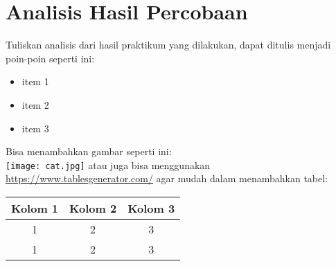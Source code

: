 \chapter{Analisis Hasil Percobaan}

Tuliskan analisis dari hasil praktikum yang dilakukan, dapat ditulis menjadi 
poin-poin seperti ini:
\begin{itemize}[noitemsep]
    \item item 1
    \item item 2
    \item item 3
\end{itemize}
Bisa menambahkan gambar seperti ini:\\
\texttt{[image: cat.jpg]}
atau juga bisa menggunakan \url{https://www.tablesgenerator.com/} agar mudah dalam 
menambahkan tabel:
\begin{table}[h!]
\begin{tabular}{|c|c|c|}
\hline
\textbf{Kolom 1} & \textbf{Kolom 2} & \textbf{Kolom 3} \\ \hline
1                & 2                & 3                \\ \hline
1                & 2                & 3                \\ \hline
\end{tabular}
\end{table}